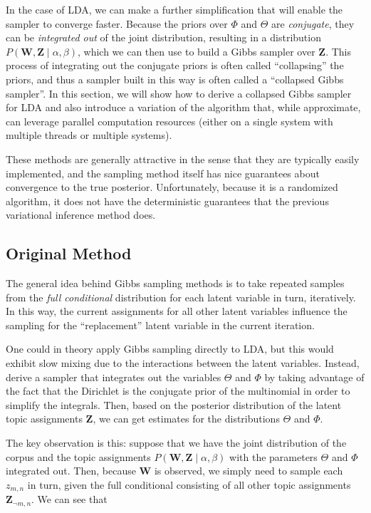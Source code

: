 \documentclass[11pt]{article}
\begin{document}
In the case of LDA, we can make a further simplification that will enable
the sampler to converge faster. Because the priors over $\Phi$ and $\Theta$
are \emph{conjugate}, they can be \emph{integrated out} of the joint
distribution, resulting in a distribution $P(\mathbf{W}, \mathbf{Z} \mid
\alpha, \beta)$, which we can then use to build a Gibbs sampler over
$\mathbf{Z}$. This process of integrating out the conjugate priors is often
called ``collapsing'' the priors, and thus a sampler built in this way is
often called a ``collapsed Gibbs sampler''. In this section, we will show
how to derive a collapsed Gibbs sampler for LDA and also introduce a
variation of the algorithm that, while approximate, can leverage parallel
computation resources (either on a single system with multiple threads or
multiple systems).

These methods are generally attractive in the sense that they are typically
easily implemented, and the sampling method itself has nice guarantees
about convergence to the true posterior. Unfortunately, because it is a
randomized algorithm, it does not have the deterministic guarantees that
the previous variational inference method does.


\label{sec:cgs}
\subsection{Original Method}
The general idea behind Gibbs sampling methods is to take repeated samples
from the \emph{full conditional} distribution for each latent variable in
turn, iteratively. In this way, the current assignments for all other
latent variables influence the sampling for the ``replacement'' latent
variable in the current iteration.

One could in theory apply Gibbs sampling directly to LDA, but this would
exhibit slow mixing due to the interactions between the latent variables.
Instead, \citet{Griffiths:2004:Topics} derive a sampler that integrates out
the variables $\Theta$ and $\Phi$ by taking advantage of the fact that the
Dirichlet is the conjugate prior of the multinomial in order to simplify
the integrals. Then, based on the posterior distribution of the latent
topic assignments $\mathbf{Z}$, we can get estimates for the distributions
$\Theta$ and $\Phi$.

The key observation is this: suppose that we have the joint distribution of
the corpus and the topic assignments $P(\mathbf{W}, \mathbf{Z} \mid \alpha,
\beta)$ with the parameters $\Theta$ and $\Phi$ integrated out. Then,
because $\mathbf{W}$ is observed, we simply need to sample each $z_{m,n}$
in turn, given the full conditional consisting of all other topic
assignments $\mathbf{Z}_{\neg m,n}$. We can see that
\end{document}

